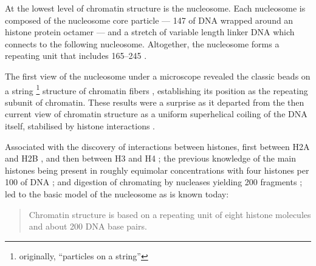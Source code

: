     At the lowest level of chromatin structure is the nucleosome.
    Each nucleosome is composed of the nucleosome core particle ---
    \SI{147}{\bp} of DNA wrapped around
    an histone protein octamer ---
    and a stretch of variable length linker DNA which connects
    to the following nucleosome.  Altogether, the nucleosome forms
    a repeating unit that includes \SIrange{165}{245}{\bp}
    \citep{widom1992-linker-length}.

    The first view of the nucleosome under a microscope revealed the
    classic beads on a string \footnote{originally, ``particles on a string''}
    structure of chromatin fibers
     \citep{olin1974-nu-bodies},
    establishing its position as the repeating subunit of chromatin.
    These results were a surprise as it departed from the then current view
    of chromatin structure as a uniform superhelical coiling of the
    DNA itself, stabilised by histone interactions
    \citep{pardon-wilkins-1972model}.

    Associated with the discovery of interactions between histones,
    first between H2A and H2B \citep{anna-isenberg-1974-h2a-h2b}, and
    then between H3 and H4 \citep{kornberg1974-results};
    the previous knowledge of the main histones being present in
    roughly equimolar concentrations with four histones per
    \SI{100}{\bp} of DNA ;
    and digestion of chromating by nucleases yielding
    \SI{200}{\bp} fragments \citep{hewish1973-200bp-pieces};
    led to the basic model of the nucleosome as is known today:

    \begin{quotation}
      Chromatin structure is based on a repeating unit of eight
      histone molecules and about 200 DNA base pairs.
    \end{quotation}

